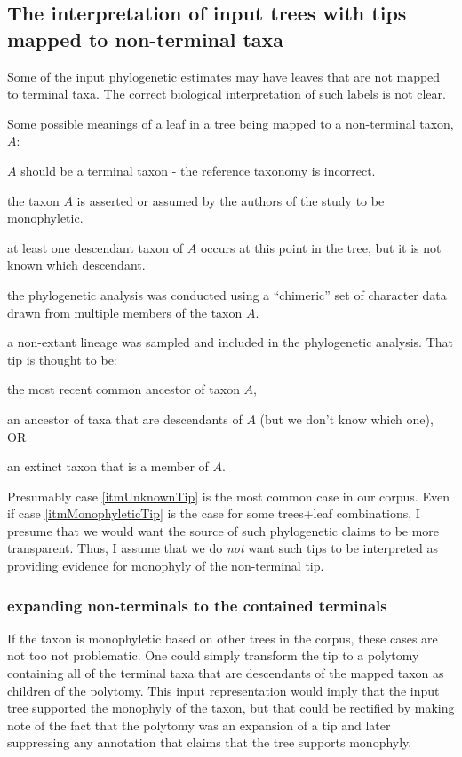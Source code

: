 \documentclass[11pt]{article}
\begin{document}
\subsection{The interpretation of input trees with tips mapped to non-terminal taxa}
Some of the input phylogenetic estimates may have leaves that are not mapped to terminal taxa.
The correct biological interpretation of such labels is not clear.

Some possible meanings of a leaf in a tree being mapped to a non-terminal taxon, $A$:
\begin{compactenum}
    \item $A$ should be a terminal taxon - the reference taxonomy is incorrect.
    \item the taxon $A$ is asserted or assumed by the authors of the study to be monophyletic.\label{itmMonophyleticTip}
    \item at least one descendant taxon of $A$ occurs at this point in the tree, but it is not known which descendant.\label{itmUnknownTip}
    \item the phylogenetic analysis was conducted using a ``chimeric'' set of character data drawn from multiple
        members of the taxon $A$.
    \item a non-extant lineage was sampled and included in the phylogenetic analysis. That tip is thought to be:
    \begin{compactenum}
        \item the most recent common ancestor of taxon $A$,
        \item an ancestor of taxa that are descendants of $A$ (but we don't know which one), OR
        \item an extinct taxon that is a member of $A$.
    \end{compactenum}
\end{compactenum}
Presumably case \ref{itmUnknownTip} is the most common case in our corpus.
Even if case \ref{itmMonophyleticTip} is the case for some trees+leaf combinations, I presume
    that we would want the source of such phylogenetic claims to be more transparent.
Thus, I assume that we do {\em not} want such tips to be interpreted as providing evidence
    for monophyly of the non-terminal tip.

\subsubsection{expanding non-terminals to the contained terminals}
If the taxon is monophyletic based on other trees in the corpus, these cases are not too not problematic.
One could simply transform the tip to a polytomy containing all of the terminal taxa that are
    descendants of the mapped taxon as children of the polytomy.
This input representation would imply that the input tree supported the monophyly of the taxon, but 
    that could be rectified by making note of the fact that the polytomy was an expansion of a tip
    and later suppressing any annotation that claims that the tree supports monophyly.
\end{document}
